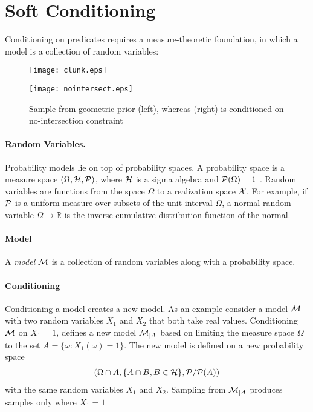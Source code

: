 
\section{Soft Conditioning}\label{simmodels}

Conditioning on predicates requires a measure-theoretic foundation, in which a model is a collection of random variables:

\begin{figure}
	\centering
	\begin{minipage}[t]{0.4\linewidth}
		\centering
		\texttt{[image: clunk.eps]}
	\end{minipage}%
	\begin{minipage}[t]{0.4\linewidth}
		\centering
		\texttt{[image: nointersect.eps]}
	\end{minipage}%
	\caption{Sample from geometric prior (left), whereas (right) is conditioned on no-intersection constraint}
	\label{fig:nointersect}
\end{figure}


\paragraph{Random Variables.} Probability models lie on top of probability
spaces. A probability space is a measure space $(\Omega, {\cal H}, {\cal P})$,
where ${\cal H}$ is a sigma algebra and ${\cal P}(\Omega) = 1$ \citep{ccinlar2011probability}. Random variables are
functions from the space $\Omega$ to a realization space ${\cal X}$. For example, if ${\cal P}$ is a uniform measure over subsets of the unit interval $\Omega$, a normal random variable $\Omega \to \mathbb{R}$ is the inverse cumulative distribution function of the normal.

\paragraph{Model} A \emph{model} ${\cal M}$ is a collection of random variables along with a probability space.

\paragraph{Conditioning}

Conditioning a model creates a new model.
As an example consider a model ${\cal M}$ with two
random variables $X_1$ and $X_2$ that both take real values. Conditioning
${\cal M}$ on $X_1 = 1$, defines a new model ${\cal M}_{|A}$ based on limiting the measure space
$\Omega$ to the set $A = \{ \omega : X_1(\omega) = 1\}$.
The new model is defined on a new probability space
\begin{align}\label{eq:condhard}
	(\Omega \cap A, \{A \cap B, B \in {\cal H} \}, {\cal P} / {\cal P}(A))
\end{align}
with the same random variables $X_1$ and $X_2$.
Sampling from ${\cal M}_{|A}$ produces
samples only where $X_1 = 1$

